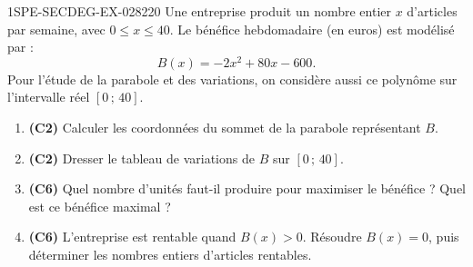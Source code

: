 \begin{exercice}{1SPE-SECDEG-EX-028}{2}{20}
Une entreprise produit un nombre entier $x$ d'articles par semaine,
avec $0 \leqslant x \leqslant 40$. Le bénéfice hebdomadaire (en euros) est modélisé par :
\[B(x) = -2x^2 + 80x - 600.\]
Pour l'étude de la parabole et des variations, on considère aussi ce polynôme
sur l'intervalle réel $[0\,;\,40]$.

\begin{enumerate}
  \item \textbf{(C2)} Calculer les coordonnées du sommet de la parabole représentant $B$.
  \item \textbf{(C2)} Dresser le tableau de variations de $B$ sur $[0\,;\,40]$.
  \item \textbf{(C6)} Quel nombre d'unités faut-il produire pour maximiser le bénéfice ? Quel est ce bénéfice maximal ?
  \item \textbf{(C6)} L'entreprise est rentable quand $B(x) > 0$. Résoudre
  $B(x) = 0$, puis déterminer les nombres entiers d'articles rentables.
\end{enumerate}
\end{exercice}
